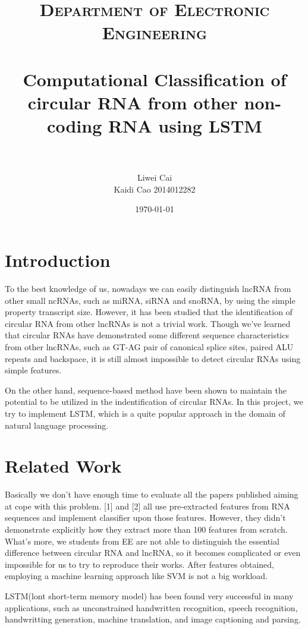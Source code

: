 \documentclass[10pt,a4paper]{article}
\title{	
\normalfont \normalsize
\textsc{Department of Electronic Engineering} \\ [25pt]
\horrule{0.5pt} \\[0.4cm] %
\huge Computational Classification of circular RNA from other non-coding RNA using LSTM\\ %
\horrule{2pt} \\[0.5cm] %
}
\author{ Liwei Cai\\
	Kaidi Cao 2014012282 } %
\date{\normalsize\today} %
\begin{document}
	
\begin{spacing}{1.5}
\begin{titlepage}
\maketitle %
\end{titlepage}

\newpage

\section{Introduction}

To the best knowledge of us, nowadays we can easily distinguish lncRNA from other small ncRNAs, such as miRNA, siRNA and snoRNA, by using the simple property transcript size. However, it has been studied that the identification of circular RNA from other lncRNAs is not a trivial work. Though we've learned that circular RNAs have demonstrated some different sequence characteristics from other lncRNAs, such as GT-AG pair of canonical splice sites, paired ALU repeats and backspace, it is still almost impossible to detect circular RNAs using simple features. 

On the other hand, sequence-based method have been shown to maintain the potential to be utilized in the indentification of circular RNAs. In this project, we try to implement LSTM, which is a quite popular approach in the domain of natural language processing. 

\section{Related Work}

Basically we don't have enough time to evaluate all the papers published aiming at cope with this problem. [1] and [2] all use pre-extracted features from RNA sequences and implement classifier upon those features. However, they didn't demonstrate explicitly how they extract more than 100 features from scratch. What's more, we students from EE are not able to distinguish the essential difference between circular RNA and lncRNA, so it becomes complicated or even impossible for us to try to reproduce their works. After features obtained, employing a machine learning approach like SVM is not a big workload.

LSTM(lont short-term memory model) has been found very successful in many applications, such as unconstrained handwritten recognition, speech recognition, handwritting generation, machine translation, and image captioning and parsing. 


\end{spacing}
\end{document}
